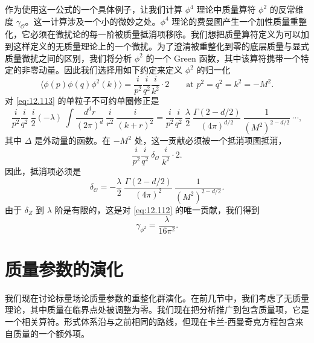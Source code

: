 作为使用这一公式的一个具体例子，让我们计算 $\phi^4$ 理论中质量算符 $\phi^2$ 的反常维度 $\gamma_{\mathcal{O}}$。这一计算涉及一个小的微妙之处。$\phi^4$ 理论的费曼图产生一个加性质量重整化，它必须在微扰论的每一阶被质量抵消项移除。我们想把质量算符定义为可以加到这样定义的无质量理论上的一个微扰。为了澄清被重整化到零的底层质量与显式质量微扰之间的区别，我们将分析 $\phi^2$ 的一个 Green 函数，其中该算符携带一个特定的非零动量。因此我们选择用如下约定来定义 $\phi^2$ 的归一化
\begin{equation}
  \bigl\langle \phi(p)\phi(q)\phi^2(k) \bigr\rangle
  = \frac{i}{p^2}\frac{i}{q^2}\frac{i}{k^2}\cdot 2
  \qquad\text{at } p^2 = q^2 = k^2 = -M^2 .
  \label{eq:12.113}
\end{equation}
对 \eqref{eq:12.113} 的单粒子不可约单圈修正是
\begin{equation}
  \frac{i}{p^2}\frac{i}{q^2}\ \frac{i}{2}(-\lambda)\ \int
    \frac{d^dr}{(2\pi)^d}\ \frac{i}{r^2}\ \frac{i}{(k+r)^2}
  = \frac{i}{p^2}\frac{i}{q^2}\ \frac{\lambda}{2}\ \frac{\Gamma(2-d/2)}
    {(4\pi)^{d/2}}\ \frac{1}{(M^2)^{2-d/2}}\ \cdots ,
  \label{eq:12.114}
\end{equation}
其中 $\Delta$ 是外动量的函数。在 $-M^2$ 处，这一贡献必须被一个抵消项图抵消，
\begin{equation}
  \frac{i}{p^2}\frac{i}{q^2}\ \delta_{\mathcal{O}}\ \frac{i}{k^2}\cdot 2 .
  \label{eq:12.115}
\end{equation}
因此，抵消项必须是
\begin{equation}
  \delta_{\mathcal{O}} = -\frac{\lambda}{2}\ \frac{\Gamma(2-d/2)}
    {(4\pi)^2}\ \frac{1}{(M^2)^{2-d/2}} .
  \label{eq:12.116}
\end{equation}
由于 $\delta_Z$ 到 $\lambda$ 阶是有限的，这是对 \eqref{eq:12.112} 的唯一贡献，我们得到
\begin{equation}
  \gamma_{\phi^2} = \frac{\lambda}{16\pi^2} .
  \label{eq:12.117}
\end{equation}

\section{质量参数的演化}

我们现在讨论标量场论质量参数的重整化群演化。在前几节中，我们考虑了无质量理论，其中质量在临界点处被调整为零。我们现在把分析推广到包含质量项，它是一个相关算符。形式体系沿与之前相同的路线，但现在卡兰-西曼奇克方程包含来自质量的一个额外项。

